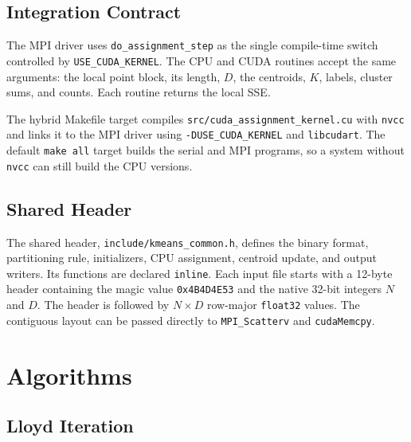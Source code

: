 \documentclass[conference]{IEEEtran}
\DeclareRobustCommand{\code}[1]{\texttt{#1}}
\DeclareRobustCommand{\file}[1]{\texttt{#1}}
\begin{document}
\subsection{Integration Contract}

The MPI driver uses \code{do\_assignment\_step} as the single compile-time switch controlled by \code{USE\_CUDA\_KERNEL}. The CPU and CUDA routines accept the same arguments: the local point block, its length, $D$, the centroids, $K$, labels, cluster sums, and counts. Each routine returns the local SSE.

The hybrid Makefile target compiles \file{src/cuda\_assignment\_kernel.cu} with \code{nvcc} and links it to the MPI driver using \code{-DUSE\_CUDA\_KERNEL} and \code{libcudart}. The default \code{make all} target builds the serial and MPI programs, so a system without \code{nvcc} can still build the CPU versions.

\subsection{Shared Header}

The shared header, \file{include/kmeans\_common.h}, defines the binary format, partitioning rule, initializers, CPU assignment, centroid update, and output writers. Its functions are declared \code{inline}. Each input file starts with a 12-byte header containing the magic value \texttt{0x4B4D4E53} and the native 32-bit integers $N$ and $D$. The header is followed by $N \times D$ row-major \texttt{float32} values. The contiguous layout can be passed directly to \code{MPI\_Scatterv} and \code{cudaMemcpy}.

\section{Algorithms}
\label{sec:algorithms}

\subsection{Lloyd Iteration}
\end{document}
